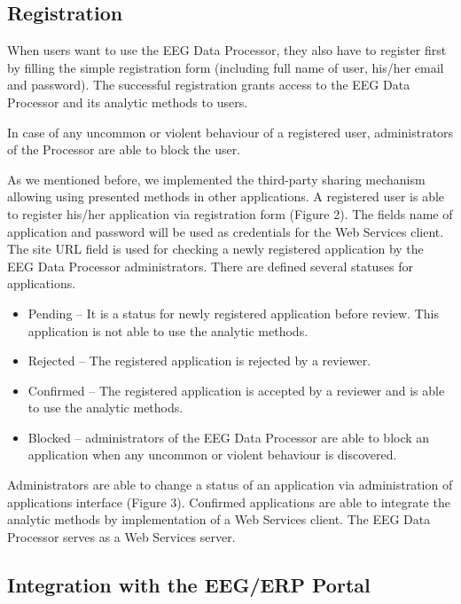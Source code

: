 \documentclass{frontiersSCNS} %
\begin{document}
\subsection{Registration}

When users want to use the EEG Data Processor, they also have to register first by filling the simple registration form (including full name of user, his/her email and password). The successful registration grants access to the EEG Data Processor and its analytic methods to users.

In case of any uncommon or violent behaviour of a registered user, administrators of the Processor are able to block the user.

As we mentioned before, we implemented the third-party sharing mechanism allowing using presented methods in other applications. A registered user is able to register his/her application via registration form (Figure 2). The fields name of application and password will be used as credentials for the Web Services client. The site URL field is used for checking a newly registered application by the EEG Data Processor administrators. There are defined several statuses for applications.

\begin{itemize}
\item Pending – It is a status for newly registered application before review. This application is not able to use the analytic methods.
\item Rejected – The registered application is rejected by a reviewer.
\item Confirmed – The registered application is accepted by a reviewer and is able to use the analytic methods.
\item Blocked – administrators of the EEG Data Processor are able to block an application when any uncommon or violent behaviour is discovered.

\end{itemize}

Administrators are able to change a status of an application via administration of applications interface (Figure 3). Confirmed applications are able to integrate the analytic methods by implementation of a Web Services client. The EEG Data Processor serves as a Web Services server.

\subsection{Integration with the EEG/ERP Portal}
\end{document}
